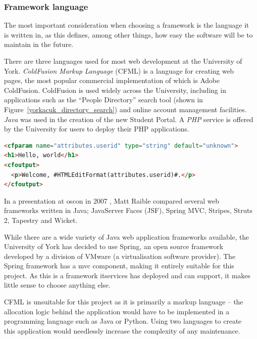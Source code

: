 \documentclass[draft]{scrartcl}
\begin{document}
\subsubsection{Framework language}


The most important consideration when choosing a framework is the language it
is written in, as this defines, among other things, how easy the software will
be to maintain in the future.


There are three languages used for most web development at the University of
York. \emph{ColdFusion Markup Language} (CFML) is a language for creating web pages,
the most popular commercial implementation of which is Adobe ColdFusion.
ColdFusion is used widely across the University, including in applications
such as the ``People Directory'' search tool (shown in
Figure~\ref{yorkacuk_directory_search}) and online account management
facilities. \emph{Java} was used in the creation of the new Student Portal. A
\emph{PHP} service is offered by the University for users to deploy their PHP
applications.

\begin{lstlisting}[language=HTML]
<cfparam name="attributes.userid" type="string" default="unknown">
<h1>Hello, world</h1>
<cfoutput>
  <p>Welcome, #HTMLEditFormat(attributes.userid)#.</p>
</cfoutput>
\end{lstlisting}

In a presentation at \gls{oscon} in 2007 \cite{raible2007javawebframeworks},
Matt Raible compared several web frameworks written in Java; JavaServer Faces
(JSF), Spring MVC, Stripes, Struts 2, Tapestry and Wicket.

While there are a wide variety of Java web application frameworks available,
the University of York has decided to use Spring, an open source framework
developed by a division of VMware (a virtualisation software provider). The
Spring framework has a \gls{mvc} component, making it entirely suitable for
this project. As this is a framework \gls{itservices} has deployed and can
support, it makes little sense to choose anything else.

CFML is unsuitable for this project as it is primarily a markup language -- the
allocation logic behind the application would have to be implemented in a
programming language such as Java or Python. Using two languages to create
this application would needlessly increase the complexity of any maintenance.
\end{document}
